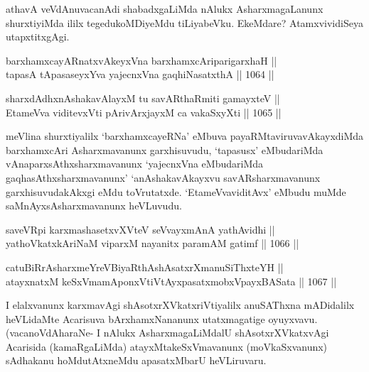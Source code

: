 \begin{artha}
athavA veVdAnuvacanAdi shabadxgaLiMda nAlukx AsharxmagaLanunx shurxtiyiMda ililx tegedukoMDiyeMdu tiLiyabeVku. EkeMdare? AtamxvividiSeya utapxtitxgAgi.
\end{artha}


\begin{shl}
barxhamxcayARnatxvAkeyxVna barxhamxcAriparigarxhaH || \\
tapasA tApasaseyxYva yajecnxVna gaqhiNasatxthA \hfill || 1064 ||  
\end{shl}
				
\begin{shl}
sharxdAdhxnAshakavAlayxM tu savARthaRmiti gamayxteV ||  \\
EtameVva viditevxVti pArivArxjayxM ca vakaSxyXti \hfill || 1065 ||  
\end{shl}

\begin{artha}
meVlina shurxtiyalilx `barxhamxcayeRNa' eMbuva payaRMtaviruvavAkayxdiMda barxhamxcAri Asharxmavanunx garxhisuvudu, `tapasusx' eMbudariMda vAnaparxsAthxsharxmavanunx `yajecnxVna eMbudariMda gaqhasAthxsharxmavanunx' `anAshakavAkayxvu savARsharxmavanunx garxhisuvudakAkxgi eMdu toVrutatxde. `EtameVvaviditAvx' eMbudu muMde saMnAyxsAsharxmavanunx heVLuvudu.
\end{artha}


\begin{shl}
saveVR\s pi karxmashasetxvXVteV seVvayxmAnA yathAvidhi || \\
yathoVkatxkAriNaM viparxM nayanitx paramAM gatimf \hfill || 1066 ||  
\end{shl}
				
\begin{shl}
catuBiRrAsharxmeYreVBiyaRthAshAsatxrXmanuSiThxteYH || \\
atayxnatxM keSxVmamAponxVtiVtAyxpasatxmobxV\s payxBASata \hfill || 1067 ||  
\end{shl}

\begin{artha}
I elalxvanunx karxmavAgi shAsotxrXVkatxriVtiyalilx anuSAThxna mADidalilx heVLidaMte Acarisuva bArxhamxNananunx utatxmagatige oyuyxvavu. (vacanoVdAharaNe- I nAlukx AsharxmagaLiMdalU shAsotxrXVkatxvAgi Acarisida (kamaRgaLiMda) atayxMtakeSxVmavanunx (moVkaSxvanunx) sAdhakanu hoMdutAtxneMdu apasatxMbarU heVLiruvaru.
\end{artha}

